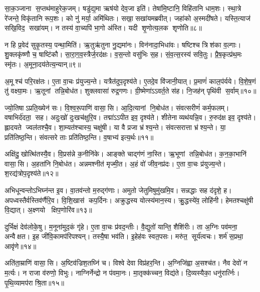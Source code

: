 सा॒क॒ञ्जाना स॒प्तथ॑माहुरेक॒जम्‌। षडु॑द्य॒मा ऋष॑यो देव॒जा इति॑। 
तेषा॑मि॒ष्टानि॒ विहि॑तानि धाम॒शः। स्था॒त्रे रे॑जन्ते॒ विकृ॑तानि रूप॒शः। 
को नु॑ मर्या॒ अमि॑थितः। सखा॒ सखा॑यमब्रवीत्‌। 
जहा॑को अ॒स्मदी॑षते। यस्ति॒त्याज॑ सखि॒विद॒ सखा॑यम्‌। 
न तस्य॑ वा॒च्यपि॑ भा॒गो अ॑स्ति। यदी शृ॒णोत्य॒लक शृणोति॥८॥

न हि प्र॒वेद॑ सुकृ॒तस्य॒ पन्था॒मिति॑। ऋ॒तु\ur{}ऋ॑तुना नु॒द्यमा॑नः। 
विन॑नादा॒भिधा॑वः। षष्टिश्च त्रिश॑का व॒ल्गाः। 
शु॒क्लकृ॑ष्णौ च॒ षाष्टि॑कौ। सा॒रा॒ग॒व॒स्त्रैर्ज॒रद॑क्षः। 
व॒स॒न्तो वसु॑भिः स॒ह। सं॒व॒त्स॒रस्य॑ सवि॒तुः। 
प्रै॒ष॒कृत्प्र॑थ॒मः स्मृ॑तः। अ॒मूना॒दय॑तेत्य॒न्यान्‌॥९॥

अ॒मूश्च॑ परि॒रक्ष॑तः। ए॒ता वा॒चः प्र॑युज्य॒न्ते। 
यत्रैत॑दुप॒दृश्य॑ते। ए॒तदे॒व वि॑जानी॒यात्। 
प्र॒माणं॑ काल॒प॑र्यये। वि॒शे॒ष॒णं तु॑ वक्ष्या॒मः। 
ऋ॒तूनां तन्नि॒बोध॑त। शुक्लवासा॑ रुद्र॒गणः। 
ग्री॒ष्मेणा॑ऽऽवर्त॒ते स॑ह। नि॒जह॑न्‌ पृथि॑वी स॒र्वाम्‌॥१०॥

ज्यो॒तिषाऽप्रति॒ख्येन॑ सः। वि॒श्व॒रू॒पाणि॑ वासा॒सि। 
आ॒दि॒त्यानां नि॒बोध॑त। संवत्सरीणं॑ कर्म॒फलम्‌। 
व\ur{}षाभिर्द॑दता॒ सह। अदुःखो॑ दुःखच॑क्षुरि॒व। 
तद्मा॑ऽऽपीत इव॒ दृश्य॑ते। शीतेनाव्यथ॑यन्नि॒व। 
रु॒रुद॑क्ष इव॒ दृश्य॑ते। ह्लादयते ज्वल॑तश्चै॒व। 
शा॒म्यत॑श्चास्य॒ चक्षु॑षी। या वै प्रजा भ्र॑श्य॒न्ते। 
संवत्सरात्ता भ्र॑श्य॒न्ते। या॒ प्रति॑तिष्ठ॒न्ति। 
संवत्सरे ताः प्रति॑तिष्ठ॒न्ति। व॒\ar{}षाभ्य॑ इत्य॒र्थः॥११॥\anuvakamend


अक्षि॑दु॒खोत्थि॑तस्यै॒व। वि॒प्रस॑न्ने क॒नीनि॑के। 
आङ्क्ते चाद्ग॑णं ना॒स्ति। ऋ॒भूणां तन्नि॒बोध॑त। 
क॒न॒का॒भानि॑ वासा॒सि। अ॒हता॑नि नि॒बोध॑त। 
अन्नमश्नीत॑ मृज्मी॒त। अ॒हं वो॑ जीव॒नप्र॑दः। 
ए॒ता वा॒चः प्र॑युज्य॒न्ते। श॒रद्य॑त्रोप॒दृश्य॑ते॥१२॥

अभिधून्वन्तोऽभिघ्न॑न्त इ॒व। वा॒तव॑न्तो म॒रुद्ग॑णाः। 
अमुतो जेतुमिषुमु॑खमि॒व। सन्नद्धाः सह द॑दृशे॒ ह। 
अपध्वस्तैर्वस्तिव॑र्णैरि॒व। वि॒शि॒खास॑ कप॒र्दिनः। 
अक्रुद्धस्य योत्स्य॑मान॒स्य। क्रु॒द्धस्ये॑व॒ लोहि॑नी। 
हेमतश्चक्षु॑षी वि॒द्यात्‌। अ॒क्ष्णयो क्षिप॒णोरि॑व॥१३॥

दुर्भिक्षं देव॑लोके॒षु। म॒नूना॑मुद॒कं गृ॑हे। 
ए॒ता वा॒चः प्र॑वद॒न्तीः। वै॒द्युतो॑ यान्ति॒ शैशि॑रीः। 
ता अ॒ग्निः पव॑मना॒ अन्वैक्षत। इ॒ह जी॑वि॒कामप॑रिपश्यन्‌। 
तस्यै॒षा भव॑ति। इ॒हेह॑वः स्वत॒पसः। 
मरु॑त॒ सूर्य॑त्वचः। शर्म॑ स॒प्रथा॒ आवृ॑णे॥१४॥\anuvakamend


अति॑ता॒म्राणि॑ वासा॒सि। अ॒ष्टिव॑ज्रिश॒तघ्नि॑ च। 
विश्वे देवा विप्र॑हर॒न्ति। अ॒ग्निजि॑ह्वा अ॒सश्च॑त। 
नैव देवो॑ न म॒र्त्यः। न राजा व॑रुणो॒ विभुः। 
नाग्निर्नेन्द्रो न प॑वमा॒नः। मा॒तृक्क॑च्चन॒ विद्य॑ते। 
दि॒व्यस्यैका॒ धनु॑रार्त्निः। पृ॒थि॒व्यामप॑रा श्रि॒ता॥१५॥

